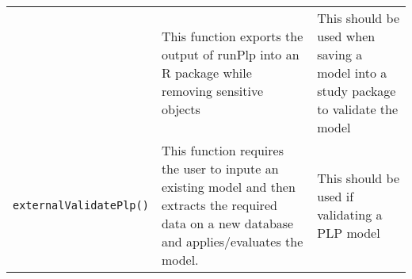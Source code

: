 \documentclass[
]{article}
\begin{document}
\begin{longtable}[]{@{}lll@{}}
\begin{minipage}[t]{0.26\columnwidth}
\end{minipage} & \begin{minipage}[t]{0.42\columnwidth}\raggedright
This function exports the output of runPlp into an R package while
removing sensitive objects\strut
\end{minipage} & \begin{minipage}[t]{0.23\columnwidth}\raggedright
This should be used when saving a model into a study package to validate
the model\strut
\end{minipage}\tabularnewline
\begin{minipage}[t]{0.26\columnwidth}\raggedright
\texttt{externalValidatePlp()}\strut
\end{minipage} & \begin{minipage}[t]{0.42\columnwidth}\raggedright
This function requires the user to inpute an existing model and then
extracts the required data on a new database and applies/evaluates the
model.\strut
\end{minipage} & \begin{minipage}[t]{0.23\columnwidth}\raggedright
This should be used if validating a PLP model\strut
\end{minipage}\tabularnewline
\bottomrule
\end{longtable}
\end{document}
